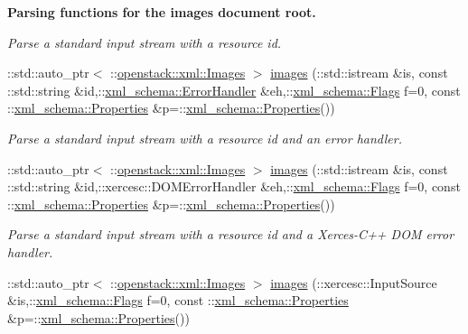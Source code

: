 \begin{Indent}{\bf Parsing functions for the images document root.}
\begin{DoxyCompactItemize}
\begin{DoxyCompactList}\small\item\em Parse a standard input stream with a resource id. \item\end{DoxyCompactList}\item 
::std::auto\_\-ptr$<$ ::\hyperlink{classopenstack_1_1xml_1_1Images}{openstack::xml::Images} $>$ \hyperlink{namespaceopenstack_1_1xml_a6d88ce4e19b64b789f46ef75bdf18ce0}{images} (::std::istream \&is, const ::std::string \&id,::\hyperlink{namespacexml__schema_ab1c9361bfd3b404eaabf0c31eded79dc}{xml\_\-schema::ErrorHandler} \&eh,::\hyperlink{namespacexml__schema_affb4c227cbd9aa7453dd1dc5a1401943}{xml\_\-schema::Flags} f=0, const ::\hyperlink{namespacexml__schema_ad27ce19a7ee1d3b1064092648898f64c}{xml\_\-schema::Properties} \&p=::\hyperlink{namespacexml__schema_ad27ce19a7ee1d3b1064092648898f64c}{xml\_\-schema::Properties}())
\begin{DoxyCompactList}\small\item\em Parse a standard input stream with a resource id and an error handler. \item\end{DoxyCompactList}\item 
::std::auto\_\-ptr$<$ ::\hyperlink{classopenstack_1_1xml_1_1Images}{openstack::xml::Images} $>$ \hyperlink{namespaceopenstack_1_1xml_a861c05af5fa470249c481ea00fd725c8}{images} (::std::istream \&is, const ::std::string \&id,::xercesc::DOMErrorHandler \&eh,::\hyperlink{namespacexml__schema_affb4c227cbd9aa7453dd1dc5a1401943}{xml\_\-schema::Flags} f=0, const ::\hyperlink{namespacexml__schema_ad27ce19a7ee1d3b1064092648898f64c}{xml\_\-schema::Properties} \&p=::\hyperlink{namespacexml__schema_ad27ce19a7ee1d3b1064092648898f64c}{xml\_\-schema::Properties}())
\begin{DoxyCompactList}\small\item\em Parse a standard input stream with a resource id and a Xerces-\/C++ DOM error handler. \item\end{DoxyCompactList}\item 
::std::auto\_\-ptr$<$ ::\hyperlink{classopenstack_1_1xml_1_1Images}{openstack::xml::Images} $>$ \hyperlink{namespaceopenstack_1_1xml_ab191ac43d8b62a457fba5cd0a7ac7b66}{images} (::xercesc::InputSource \&is,::\hyperlink{namespacexml__schema_affb4c227cbd9aa7453dd1dc5a1401943}{xml\_\-schema::Flags} f=0, const ::\hyperlink{namespacexml__schema_ad27ce19a7ee1d3b1064092648898f64c}{xml\_\-schema::Properties} \&p=::\hyperlink{namespacexml__schema_ad27ce19a7ee1d3b1064092648898f64c}{xml\_\-schema::Properties}())

\end{DoxyCompactItemize}
\end{Indent}
